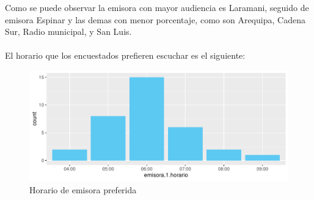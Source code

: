 \documentclass[12pt]{article}\usepackage[]{graphicx}\usepackage[]{xcolor}
\makeatletter
\def\maxwidth{ %
  \ifdim\Gin@nat@width>\linewidth
    \linewidth
  \else
    \Gin@nat@width
  \fi
}
\newenvironment{knitrout}{}{} %
\makeatother
\begin{document}
	Como se puede observar la emisora con mayor audiencia es Laramani, seguido de emisora Espinar y las demas con menor porcentaje, como son Arequipa, Cadena Sur, Radio municipal, y San Luis.\\
	\\
	El horario que los encuestados prefieren escuchar es el siguiente:
	\begin{figure}[H]
	\centering
\begin{knitrout}
\color{fgcolor}
\includegraphics[width=\maxwidth]{figure/two-1} 
\end{knitrout}
	\caption{Horario de emisora preferida}
	\end{figure}
	
\end{document}
